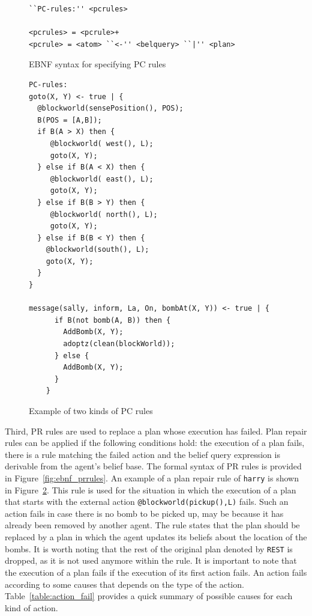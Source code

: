 \documentclass[a4paper]{article}
\begin{document}
\begin{figure}[htp]
\begin{verbatim}
``PC-rules:'' <pcrules>

<pcrules> = <pcrule>+
<pcrule> = <atom> ``<-'' <belquery> ``|'' <plan>
\end{verbatim}
\caption{EBNF syntax for specifying PC rules}
\label{fig:ebnf_pcrules}
\end{figure}

\begin{figure}[htp]
\begin{verbatim}
PC-rules:
goto(X, Y) <- true | {
  @blockworld(sensePosition(), POS);
  B(POS = [A,B]);
  if B(A > X) then {
     @blockworld( west(), L);
     goto(X, Y);
  } else if B(A < X) then {
     @blockworld( east(), L);
     goto(X, Y);
  } else if B(B > Y) then {
     @blockworld( north(), L);
     goto(X, Y);
  } else if B(B < Y) then {
    @blockworld(south(), L);
    goto(X, Y);
  }
}

message(sally, inform, La, On, bombAt(X, Y)) <- true | {
	  if B(not bomb(A, B)) then { 
	    AddBomb(X, Y);
	    adoptz(clean(blockWorld));
	  } else { 
	    AddBomb(X, Y);
	  }
	}
\end{verbatim}
\caption{Example of two kinds of PC rules}
\label{fig:example_pcrules}
\end{figure}

Third, PR rules are used to replace a plan whose execution has failed. Plan repair rules can be applied if the following conditions hold: the execution of a plan fails, there is a rule matching the failed action and the belief query expression is derivable from the agent's belief base. The formal syntax of PR rules is provided in Figure~\ref{fig:ebnf_prrules}. 
An example of a plan repair rule of \texttt{harry} is shown in Figure~\ref{fig:example_pcrules}. This rule is used for the situation in which the execution of a plan that starts with the external action \texttt{@blockworld(pickup(),L)} fails. Such an action fails in case there is no bomb to be picked up, may be because it has already been removed by another agent. The rule states that the plan should be replaced by a plan in which the agent updates its beliefs about the location of the bombs. It is worth noting that the rest of the original plan denoted by \texttt{REST} is dropped, as it is not used anymore within the rule. It is important to note that the execution of a plan fails if the execution of its first action fails. An action fails according to some causes that depends on the type of the action. Table~\ref{table:action_fail} provides a quick summary of possible causes for each kind of action.
\end{document}
